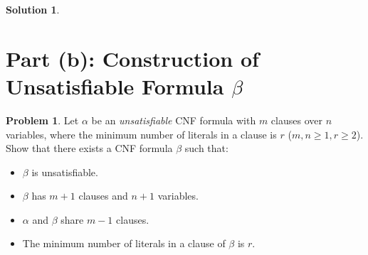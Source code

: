 \documentclass[12pt,a4paper]{article}
\theoremstyle{definition}
\newtheorem{problem}{Problem}
\newtheorem{solution}{Solution}
\begin{document}
\begin{solution}
\begin{center}
\end{center}

\end{solution}

\newpage

\section*{Part (b): Construction of Unsatisfiable Formula $\beta$}

\begin{problem}
Let $\alpha$ be an \textit{unsatisfiable} CNF formula with $m$ clauses over $n$ variables, where the minimum number of literals in a clause is $r$ ($m, n \ge 1, r \ge 2$). Show that there exists a CNF formula $\beta$ such that:
\begin{itemize}
    \item $\beta$ is unsatisfiable.
    \item $\beta$ has $m+1$ clauses and $n+1$ variables.
    \item $\alpha$ and $\beta$ share $m-1$ clauses.
    \item The minimum number of literals in a clause of $\beta$ is $r$.
\end{itemize}
\end{problem}
\end{document}
